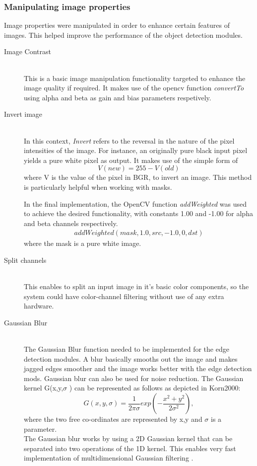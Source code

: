 \subsubsection{Manipulating image properties} 
Image properties were manipulated in order to enhance certain features of images. This helped improve the performance of the object detection modules.
\begin{description}
\item[Image Contrast]\hfill \\
This is a basic image manipulation functionality targeted to enhance the image quality if required.
It makes use of the opencv function \emph{convertTo} using alpha and beta as gain and bias parameters respetively.

\item[Invert image]\hfill \\
In this context, \emph{Invert} refers to the reversal in the nature of the pixel intensities of the image.
For instance, an originally pure black input pixel yields a pure white pixel as output.
It makes use of the simple form of  
\begin{equation} V(new) = 255 - V(old)  
\end{equation} 
where V is the value of the pixel in BGR, to invert an image. 
This method is particularly helpful when working with masks.

In the final implementation, the OpenCV function \emph{addWeighted} was used to achieve the desired functionality, with constants 1.00 and -1.00 for alpha and beta channels respectively.
\begin{align*}
addWeighted(mask, 1.0, src, -1.0, 0, dst)
\end{align*}
where the mask is a pure white image.

\item[Split channels]\hfill \\
This enables to split an input image in it's basic color components, so the system could have color-channel filtering without use of any extra hardware.

\item[Gaussian Blur]\hfill \\
The Gaussian Blur function \cite{web:gaussianBlur}  needed to be implemented for the edge detection modules. A blur basically smooths out the image and makes jagged edges smoother and the image works better with the edge detection mods. Gaussian blur can also be used for noise reduction. The Gaussian kernel G(x,y,$\sigma$ ) can be represented as follows as depicted in Korn2000:
\cite{korn2000mathematical}
\begin{equation}
G(x,y,\sigma)=\frac{1}{2\pi \sigma}exp(-\frac{x^2+y^2}{2\sigma ^2}),
\end{equation}
where the two free co-ordinates are represented by x,y and $\sigma$ is a parameter.
\\The Gaussian blur works by using a 2D Gaussian kernel that can be separated into two operations of the 1D kernel. This enables very fast implementation of multidimensional Gaussian filtering \cite{korn2000mathematical}.  


\end{description}
